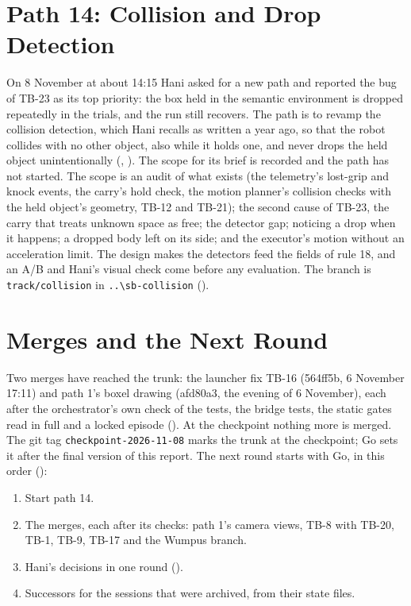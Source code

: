 \section{Path 14: Collision and Drop Detection}
\label{sec:path14}

On 8 November at about 14:15 Hani asked for a new path and reported the bug of TB-23
as its top priority: the box held in the semantic environment is dropped repeatedly in
the trials, and the run still recovers. The path is to revamp the collision detection,
which Hani recalls as written a year ago, so that the robot collides with no other object, also
while it holds one, and never drops the held object unintentionally
(, ). The scope for its brief is recorded and
the path has not started. The scope is an audit of what exists (the telemetry's lost-grip and knock
events, the carry's hold check, the motion planner's collision checks with the held
object's geometry, TB-12 and TB-21); the second cause of TB-23, the carry that treats
unknown space as free; the detector gap; noticing a drop when it happens; a dropped
body left on its side; and the executor's motion without an acceleration limit. The
design makes the detectors feed the fields of rule 18, and an A/B and Hani's visual
check come before any evaluation. The branch is \texttt{track/collision} in
\texttt{..\textbackslash sb-collision} ().

\section{Merges and the Next Round}
\label{sec:merges}

Two merges have reached the trunk: the launcher fix TB-16 (564ff5b, 6 November 17:11)
and path 1's boxel drawing (afd80a3, the evening of 6 November), each after
the orchestrator's own check of the tests, the bridge tests, the static gates read in
full and a locked episode (). At the checkpoint
nothing more is merged. The git tag \texttt{checkpoint-2026-11-08} marks the trunk at
the checkpoint; Go sets it after the final version of this report. The next round
starts with Go, in this order ():
\begin{enumerate}
  \item Start path 14.
  \item The merges, each after its checks: path 1's camera views, TB-8 with TB-20,
  TB-1, TB-9, TB-17 and the Wumpus branch.
  \item Hani's decisions in one round ().
  \item Successors for the sessions that were archived, from their state files.
\end{enumerate}
